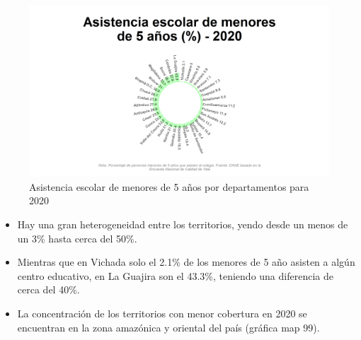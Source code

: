     \begin{figure}[H]
        \caption{Asistencia escolar de menores de 5 años por departamentos para 2020 \label{map_result_2} }
        \begin{center}
        \includegraphics[width=\textwidth,keepaspectratio]{img/var_99_static.png}
        \end{center}
    \end{figure}
            \begin{itemize}
                \item Hay una gran heterogeneidad entre los territorios, yendo desde un menos de un 3\% hasta cerca del 50\%.
                \item Mientras que en Vichada solo el 2.1\% de los menores de 5 año asisten a algún centro educativo, en La Guajira son el 43.3\%, teniendo una diferencia de cerca del 40\%.
                \item La concentración de los territorios con menor cobertura en 2020 se encuentran en la zona amazónica y oriental del país (gráfica map 99).
                \end{itemize}

